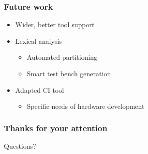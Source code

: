 \documentclass[british,10pt]{beamer}
\begin{document}
\begin{frame}\frametitle{Future work}
\begin{itemize}
\item Wider, better tool support
\item Lexical analysis
\begin{itemize}
\item Automated partitioning
\item Smart test bench generation
\end{itemize}
\item Adapted CI tool
\begin{itemize}
\item Specific needs of hardware development
\end{itemize}
\end{itemize}
\end{frame}


\begin{frame}\frametitle{Thanks for your attention}
\centering
\Huge Questions?
\end{frame}
\end{document}
